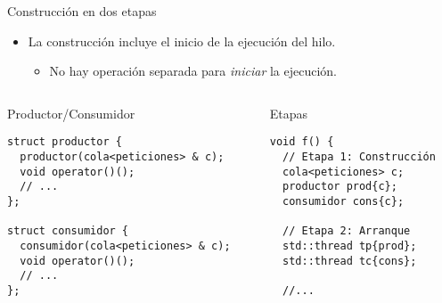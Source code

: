 \begin{frame}[fragile]{Construcción en dos etapas}
\begin{itemize}
  \item La construcción incluye el inicio de la ejecución del hilo.
    \begin{itemize}
      \item No hay operación separada para \emph{iniciar} la ejecución.
    \end{itemize}
\end{itemize}
\begin{columns}

\begin{column}{.5\textwidth}
\begin{block}{Productor/Consumidor}
\begin{lstlisting}
struct productor {
  productor(cola<peticiones> & c);
  void operator()();
  // ...
};

struct consumidor {
  consumidor(cola<peticiones> & c);
  void operator()();
  // ...
};
\end{lstlisting}
\end{block}
\end{column}

\begin{column}{.5\textwidth}
\begin{block}{Etapas}
\begin{lstlisting}
void f() {
  // Etapa 1: Construcción
  cola<peticiones> c;
  productor prod{c};
  consumidor cons{c};

  // Etapa 2: Arranque
  std::thread tp{prod};
  std::thread tc{cons};

  //...
\end{lstlisting}
\end{block}
\end{column}

\end{columns}
\end{frame}

